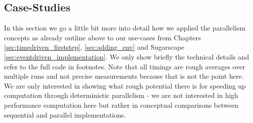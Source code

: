 \subsection{Case-Studies}
In this section we go a little bit more into detail how we applied the parallelism concepts as already outline above to our use-cases from Chapters \ref{sec:timedriven_firststep}, \ref{sec:adding_env} and Sugarscape \ref{sec:eventdriven_implementation}. We only show briefly the technical details and refer to the full code in footnotes. Note that all timings are rough averages over multiple runs and not precise measurements because that is not the point here. We are only interested in showing what rough potential there is for speeding up computation through deterministic parallelism - we are not interested in high performance computation here but rather in conceptual comparisons between sequential and parallel implementations.




\\

